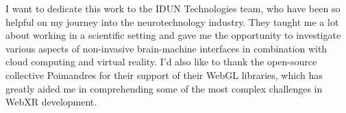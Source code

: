 \begin{dedication}

	I want to dedicate this work to the IDUN Technologies team, who have been so helpful on my journey into the neurotechnology industry. They taught me a lot about working in a scientific setting and gave me the opportunity to investigate various aspects of non-invasive brain-machine interfaces in combination with cloud computing and virtual reality. I'd also like to thank the open-source collective Poimandres for their support of their WebGL libraries, which has greatly aided me in comprehending some of the most complex challenges in WebXR development.

\end{dedication}